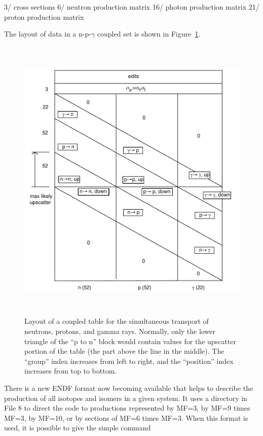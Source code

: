 \small
\begin{ccode}

   3/ cross sections
   6/ neutron production matrix
   16/ photon production matrix
   21/ proton production matrix

\end{ccode}
\normalsize

\noindent
The layout of data in a n-p-$\gamma$ coupled set is shown in
Figure~\ref{npg}.

\begin{figure}[thb]\centering
\includegraphics[keepaspectratio, height=5.5in, angle=0]{figs/groupr8}
\caption[Coupled neutron-proton-photon table]{Layout of a coupled table for
 the simultaneous transport of neutrons, protons, and gamma rays.  Normally,
 only the lower triangle of the ``p to n'' block would contain values for the
 upscatter portion of the table (the part above the line in the middle).  The
 ``group'' index increases from left to right, and the ``position'' index
 increases from top to bottom.}
\label{npg}
\end{figure}

There is a new ENDF format now becoming available that helps to
describe the production of all isotopes and isomers in a given system.
It uses a directory in File 8 to direct the code to productions
represented by MF=3, by MF=9 times MF=3, by MF=10, or by sections
of MF=6 times MF=3.  When this format is used, it is possible to
give the simple command

